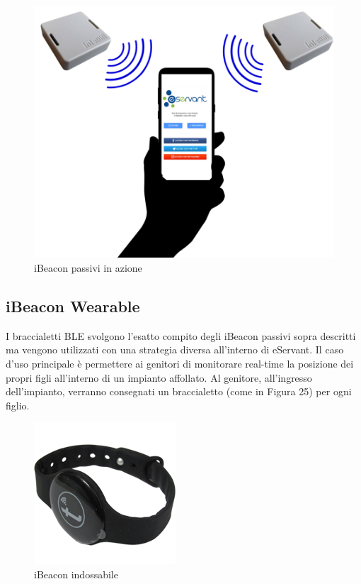 \begin{figure}[H]
    \centering  
    \caption{iBeacon passivi in azione}
    \includegraphics[scale=0.4]{img/cap4/ibeacon-advertising}
\end{figure}

\subsection{iBeacon Wearable}

I braccialetti BLE svolgono l'esatto compito degli iBeacon passivi sopra descritti ma vengono utilizzati
con una strategia diversa all'interno di eServant.
Il caso d'uso principale è permettere ai genitori di monitorare real-time la posizione dei propri
figli all'interno di un impianto affollato.
Al genitore, all'ingresso dell'impianto, verranno consegnati un braccialetto (come in Figura 25) per ogni figlio.

\begin{figure}[H]
    \centering  
    \caption{iBeacon indossabile}
    \includegraphics[scale=0.6]{img/cap4/wearable}
\end{figure}

